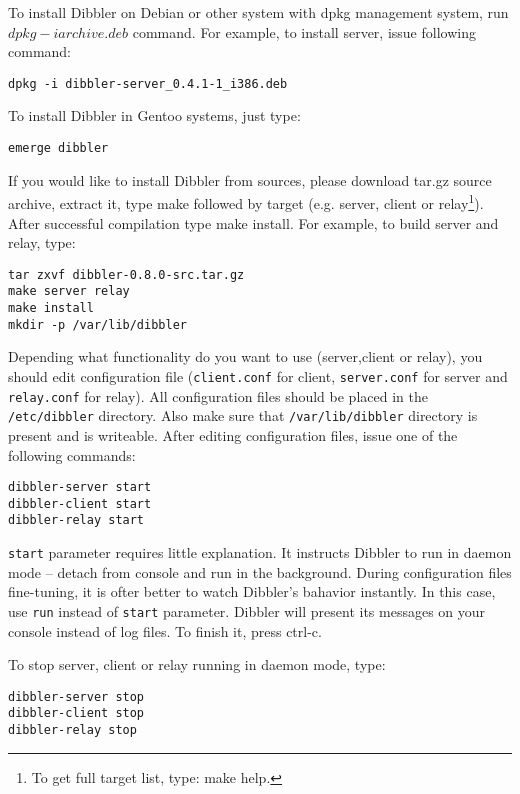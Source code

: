 To install Dibbler on Debian or other system with dpkg management
system, run $dpkg -i archive.deb$ command. For example, to install
server, issue following command:

\begin{verbatim}
dpkg -i dibbler-server_0.4.1-1_i386.deb
\end{verbatim}

To install Dibbler in Gentoo systems, just type:

\begin{verbatim}
emerge dibbler
\end{verbatim}

If you would like to install Dibbler from sources, please download tar.gz
source archive, extract it, type make followed by target (e.g. server,
client or relay\footnote{To get full target list, type: make help.}).
After successful compilation type make install. For example, to build
server and relay, type:

\begin{verbatim}
tar zxvf dibbler-0.8.0-src.tar.gz
make server relay
make install
mkdir -p /var/lib/dibbler
\end{verbatim}

Depending what functionality do you want to use (server,client or relay),
you should edit configuration file (\verb+client.conf+ for client, \verb+server.conf+
for server and \verb+relay.conf+ for relay). All configuration files should
be placed in the \verb+/etc/dibbler+ directory. Also make sure that
\verb+/var/lib/dibbler+ directory is present and is writeable. After
editing configuration files, issue one of the following commands:

\begin{verbatim}
dibbler-server start
dibbler-client start
dibbler-relay start
\end{verbatim}

\verb+start+ parameter requires little explanation. It
instructs Dibbler to run in daemon mode -- detach from console and run
in the background. During configuration files fine-tuning, it is ofter better
to watch Dibbler's bahavior instantly. In this case, use \verb+run+
instead of \verb+start+ parameter. Dibbler will present its messages on
your console instead of log files. To finish it, press ctrl-c.

To stop server, client or relay running in daemon mode, type:
\begin{verbatim}
dibbler-server stop
dibbler-client stop
dibbler-relay stop
\end{verbatim}

